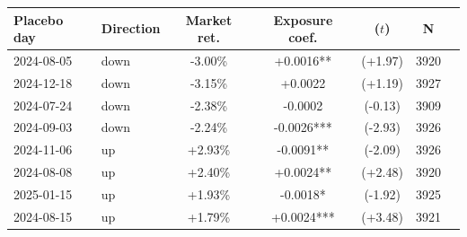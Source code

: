 \begin{tabular}{llccccc}
\toprule
Placebo day & Direction & Market ret. & Exposure coef. & ($t$) & N \\
\midrule
2024-08-05 & down & -3.00\% & +0.0016** & (+1.97) & 3920 \\
2024-12-18 & down & -3.15\% & +0.0022 & (+1.19) & 3927 \\
2024-07-24 & down & -2.38\% & -0.0002 & (-0.13) & 3909 \\
2024-09-03 & down & -2.24\% & -0.0026*** & (-2.93) & 3926 \\
2024-11-06 & up & +2.93\% & -0.0091** & (-2.09) & 3926 \\
2024-08-08 & up & +2.40\% & +0.0024** & (+2.48) & 3920 \\
2025-01-15 & up & +1.93\% & -0.0018* & (-1.92) & 3925 \\
2024-08-15 & up & +1.79\% & +0.0024*** & (+3.48) & 3921 \\
\bottomrule
\end{tabular}